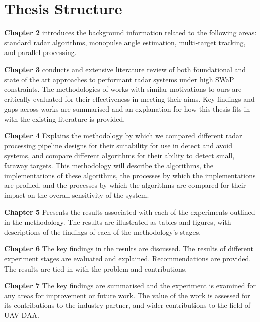 \section{Thesis Structure}
\textbf{Chapter 2} introduces the background information related to the following areas: standard radar algorithms, monopulse angle estimation, multi-target tracking, and parallel processing.

\textbf{Chapter 3} conducts and extensive literature review of both foundational and state of the art approaches to performant radar systems under high SWaP constraints. The methodologies of works with similar motivations to ours are critically evaluated for their effectiveness in meeting their aims. Key findings and gaps across works are summarised and an explanation for how this thesis fits in with the existing literature is provided. 

\textbf{Chapter 4} Explains the methodology by which we compared different radar processing pipeline designs for their suitability for use in detect and avoid systems, and compare different algorithms for their ability to detect small, faraway targets. This methodology will describe the algorithms, the implementations of these algorithms, the processes by which the implementations are profiled, and the processes by which the algorithms are compared for their impact on the overall sensitivity of the system. 

\textbf{Chapter 5} Presents the results associated with each of the experiments outlined in the methodology. The results are illustrated as tables and figures, with descriptions of the findings of each of the methodology's stages.

\textbf{Chapter 6} The key findings in the results are discussed. The results of different experiment stages are evaluated and explained. Recommendations are provided. The results are tied in with the problem and contributions.

\textbf{Chapter 7} The key findings are summarised and the experiment is examined for any areas for improvement or future work. The value of the work is assessed for its contributions to the industry partner, and wider contributions to the field of UAV DAA.

